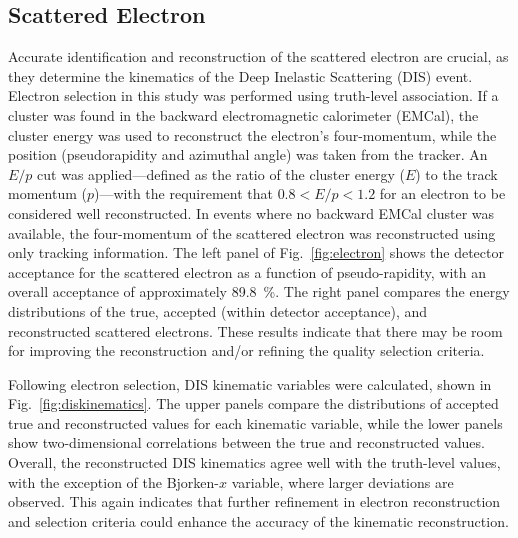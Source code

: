 \documentclass[letterpaper,12pt]{article}
\begin{document}
\subsection{Scattered Electron}\label{subsec:ScatteredElectron}
Accurate identification and reconstruction of the scattered electron are crucial, as they determine the kinematics of the Deep Inelastic Scattering (DIS) event. Electron selection in this study was performed using truth-level association. If a cluster was found in the backward electromagnetic calorimeter (EMCal), the cluster energy was used to reconstruct the electron's four-momentum, while the position (pseudorapidity and azimuthal angle) was taken from the tracker. An $E/p$ cut was applied—defined as the ratio of the cluster energy ($E$) to the track momentum ($p$)—with the requirement that $0.8 < E/p < 1.2$ for an electron to be considered well reconstructed. In events where no backward EMCal cluster was available, the four-momentum of the scattered electron was reconstructed using only tracking information. The left panel of Fig.~\ref{fig:electron} shows the detector acceptance for the scattered electron as a function of pseudo-rapidity, with an overall acceptance of approximately 89.8~\%. The right panel compares the energy distributions of the true, accepted (within detector acceptance), and reconstructed scattered electrons. These results indicate that there may be room for improving the reconstruction and/or refining the quality selection criteria.

Following electron selection, DIS kinematic variables were calculated, shown in Fig.~\ref{fig:diskinematics}. The upper panels compare the distributions of accepted true and reconstructed values for each kinematic variable, while the lower panels show two-dimensional correlations between the true and reconstructed values. Overall, the reconstructed DIS kinematics agree well with the truth-level values, with the exception of the Bjorken-$x$ variable, where larger deviations are observed. This again indicates that further refinement in electron reconstruction and selection criteria could enhance the accuracy of the kinematic reconstruction.
\end{document}
